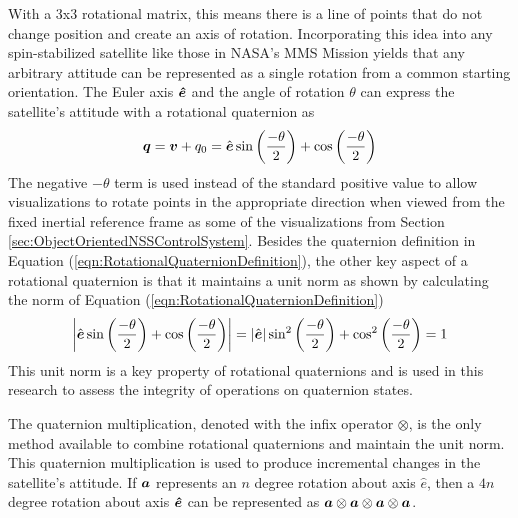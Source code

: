 With a 3x3 rotational matrix, this means there is a line of points that do not change position and create an axis of rotation.  Incorporating this idea into any spin-stabilized satellite like those in NASA's MMS Mission yields that any arbitrary attitude can be represented as a single rotation from a common starting orientation.  The Euler axis $\boldsymbol{\hat{e}}$ and the angle of rotation $\theta$ can express the satellite's attitude with a rotational quaternion as
\begin{equation}
  \boldsymbol{q} = \boldsymbol{v} + q_0 = \hat{\boldsymbol{e}} \sin \left( \frac{-\theta}{2} \right) + \cos \left( \frac{-\theta}{2} \right)
  \label{eqn:RotationalQuaternionDefinition}
\end{equation}
The negative $-\theta$ term is used instead of the standard positive value to allow visualizations to rotate points in the appropriate direction when viewed from the fixed inertial reference frame as some of the visualizations from Section \ref{sec:ObjectOrientedNSSControlSystem}.  Besides the quaternion definition in Equation (\ref{eqn:RotationalQuaternionDefinition}), the other key aspect of a rotational quaternion is that it maintains a unit norm as shown by calculating the norm of Equation (\ref{eqn:RotationalQuaternionDefinition})
\begin{equation}
  \left| \hat{\boldsymbol{e}} \sin \left( \frac{-\theta}{2} \right) + \cos \left( \frac{-\theta}{2} \right) \right| = \left| \hat{\boldsymbol{e}} \right|  \sin^2 \left( \frac{-\theta}{2} \right) + \cos^2 \left( \frac{-\theta}{2} \right) = 1
\end{equation}
This unit norm is a key property of rotational quaternions and is used in this research to assess the integrity of operations on quaternion states.

The quaternion multiplication, denoted with the infix operator $\otimes$, is the only method available to combine rotational quaternions and maintain the unit norm.  This quaternion multiplication is used to produce incremental changes in the satellite's attitude.  If $\boldsymbol{a}$ represents an $n$ degree rotation about axis $\hat{e}$, then a $4n$ degree rotation about axis $\boldsymbol{\hat{e}}$ can be represented as $\boldsymbol{a} \otimes \boldsymbol{a} \otimes \boldsymbol{a} \otimes \boldsymbol{a}$.

